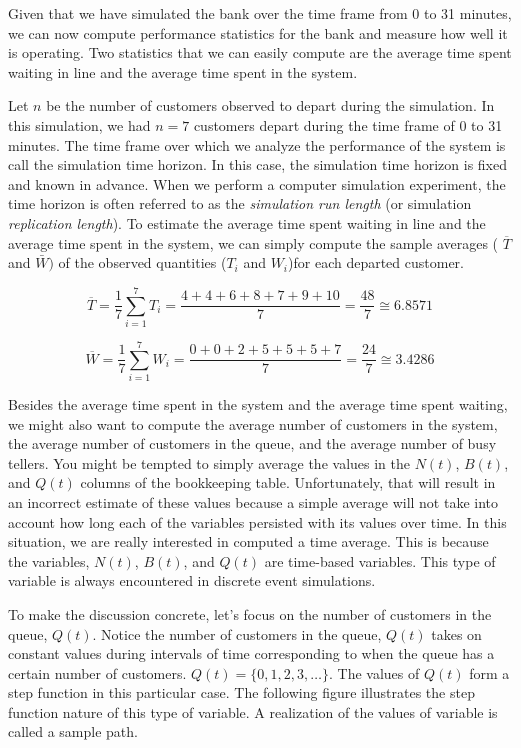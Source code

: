 \documentclass[
]{book}
\theoremstyle{definition}
\theoremstyle{definition}
\theoremstyle{definition}
\theoremstyle{definition}
\theoremstyle{remark}
\begin{document}
Given that we have simulated the bank over the time frame from 0 to 31
minutes, we can now compute performance statistics for the bank and
measure how well it is operating. Two statistics that we can easily
compute are the average time spent waiting in line and the average time
spent in the system.

Let \(n\) be the number of customers observed to depart during the
simulation. In this simulation, we had \(n = 7\) customers depart during
the time frame of 0 to 31 minutes. The time frame over which we analyze
the performance of the system is call the simulation time horizon. In
this case, the simulation time horizon is fixed and known in advance.
When we perform a computer simulation experiment, the time horizon is
often referred to as the \emph{simulation run length} (or simulation
\emph{replication length}). To estimate the average time spent waiting in
line and the average time spent in the system, we can simply compute the
sample averages ( \(\overline{T}\) and \(\bar{W})\) of the observed
quantities (\(T_{i}\) and \(W_{i}\))for each departed customer.

\[\overline{T} = \frac{1}{7}\sum_{i = 1}^{7}T_{i} = \frac{4 + 4 + 6 + 8 + 7 + 9 + 10}{7} = \frac{48}{7} \cong 6.8571\]

\[\overline{W} = \frac{1}{7}\sum_{i = 1}^{7}W_{i} = \frac{0 + 0 + 2 + 5 + 5 + 5 + 7}{7} = \frac{24}{7} \cong 3.4286\]

Besides the average time spent in the system and the average time spent
waiting, we might also want to compute the average number of customers
in the system, the average number of customers in the queue, and the
average number of busy tellers. You might be tempted to simply average
the values in the \(N(t)\), \(B(t)\), and \(Q(t)\) columns of the bookkeeping table.
Unfortunately, that will result in an incorrect estimate of these values
because a simple average will not take into account how long each of the
variables persisted with its values over time. In this situation, we are
really interested in computed a time average. This is because the
variables, \(N(t)\), \(B(t)\), and \(Q(t)\) are time-based variables. This type of
variable is always encountered in discrete event simulations.

To make the discussion concrete, let's focus on the number of customers
in the queue, \(Q(t)\). Notice the number of customers in the queue, \(Q(t)\)
takes on constant values during intervals of time corresponding to when
the queue has a certain number of customers.
\(Q(t) = \{ 0,1,2,3,\ldots\}\). The values of \(Q(t)\) form a step
function in this particular case. The following figure illustrates the
step function nature of this type of variable. A realization of the
values of variable is called a sample path.
\end{document}
